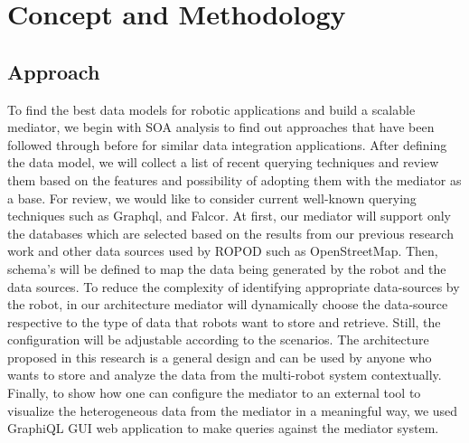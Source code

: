 

	\let\cleardoublepage\clearpage
\chapter{Concept and Methodology}\label{sec:concept_and_methodology}

\section{Approach}\label{sec:approach}
To find the best data models for robotic applications and build a scalable mediator, we begin with SOA analysis to find out approaches that have been followed through before for similar data integration applications. After defining the data model, we will collect a list of recent querying techniques and review them based on the features and possibility of adopting them with the mediator as a base.  For review, we would like to consider current well-known querying techniques such as Graphql, and Falcor. At first, our mediator will support only the databases which are selected based on the results from our previous research work \cite{ravichandranworkbench} and other data sources used by ROPOD such as OpenStreetMap. Then, schema's will be defined to map the data being generated by the robot and the data sources. To reduce the complexity of identifying appropriate data-sources by the robot, in our architecture mediator will dynamically choose the data-source respective to the type of data that robots want to store and retrieve. Still, the configuration will be adjustable according to the scenarios. The architecture proposed in this research is a general design and can be used by anyone who wants to store and analyze the data from the multi-robot system contextually. Finally, to show how one can configure the mediator to an external tool to visualize the heterogeneous data from the mediator in a meaningful way, we used GraphiQL GUI web application to make queries against the mediator system.

